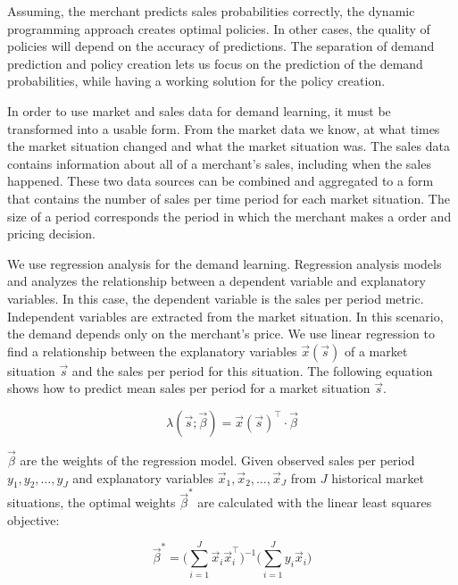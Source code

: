 Assuming, the merchant predicts sales probabilities correctly, the dynamic programming approach creates optimal policies.
In other cases, the quality of policies will depend on the accuracy of predictions. 
The separation of demand prediction and policy creation lets us focus on the prediction of the demand probabilities, while having a working solution for the policy creation.

In order to use market and sales data for demand learning, it must be transformed into a usable form.
From the market data we know, at what times the market situation changed and what the market situation was.
The sales data contains information about all of a merchant's sales, including when the sales happened.
These two data sources can be combined and aggregated to a form that contains the number of sales per time period for each market situation.
The size of a period corresponds the period in which the merchant makes a order and pricing decision.

We use regression analysis for the demand learning.
Regression analysis models and analyzes the relationship between a dependent variable and explanatory variables.
In this case, the dependent variable is the sales per period metric.
Independent variables are extracted from the market situation.
In this scenario, the demand depends only on the merchant's price.
We use linear regression to find a relationship between the explanatory variables $\vec{x}(\vec{s})$ of a market situation $\vec{s}$ and the sales per period for this situation.
The following equation shows how to predict mean sales per period for a market situation $\vec{s}$.

\begin{equation}
\label{eq:linear_regression}
\lambda(\vec{s}; \vec{\beta}) = \vec{x}(\vec{s})^\intercal \cdot \vec{\beta}
\end{equation}

$\vec{\beta}$ are the weights of the regression model.
Given observed sales per period $y_1, y_2, \ldots, y_J$ and explanatory variables $\vec{x}_1, \vec{x}_2, \ldots, \vec{x}_J$ from $J$ historical market situations, the optimal weights $\vec{\beta}^*$ are calculated with the linear least squares objective:

\begin{equation}
\vec{\beta}^* = \bigg(\sum_{i=1}^J{\vec{x}_i \vec{x}_i^\intercal} \bigg)^{-1}
			  \bigg(\sum_{i=1}^J{y_i \vec{x}_i} \bigg)
\end{equation}

